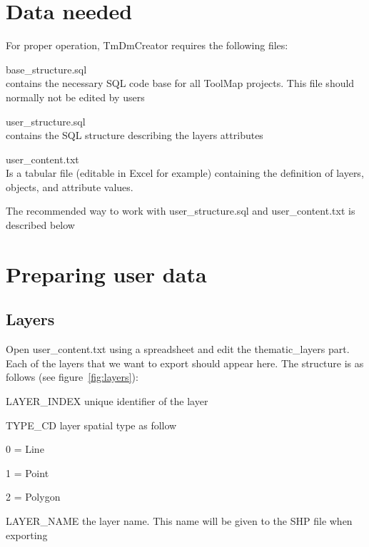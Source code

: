 \documentclass[a4paper, 12pt]{article}
\begin{document}
\section{Data needed}
For proper operation,  TmDmCreator requires the following files:
\begin{description*}
  \item[base\_structure.sql]\hfill \\ contains the necessary SQL code base for all ToolMap projects. This file should normally not be edited by users
  \item[user\_structure.sql]\hfill \\ contains the SQL structure describing the layers attributes
  \item[user\_content.txt]\hfill \\ Is a tabular file (editable in Excel for example) containing the definition of layers, objects, and attribute values.
\end{description*}
The recommended way to work with user\_structure.sql and user\_content.txt is described below

\clearpage
\section{Preparing user data}

\subsection{Layers}
Open user\_content.txt using a spreadsheet and edit the thematic\_layers part. Each of the layers that we want to export should appear here. The structure is as follows (see figure~\ref{fig:layers}):
\begin{description*}
  \item [LAYER\_INDEX] unique identifier of the layer
  \item [TYPE\_CD] layer spatial type as follow
    \begin{description*}
      \item [0] = Line
      \item [1] = Point
      \item [2] = Polygon
    \end{description*}
  \item [LAYER\_NAME] the layer name. This name will be given to the SHP file when exporting
\end{description*}
\end{document}
